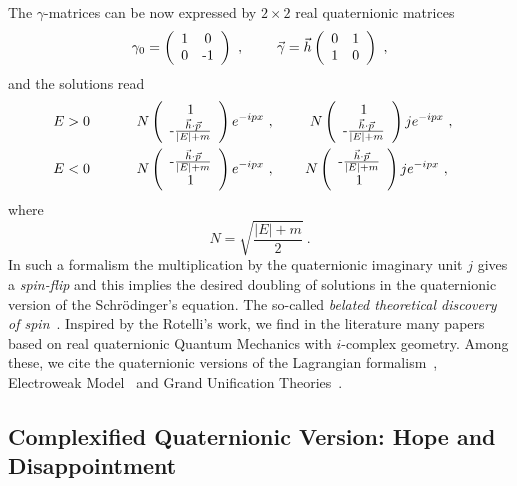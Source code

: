 The $\gamma$-matrices can be now expressed by $2\times 2$ real quaternionic 
matrices
\[ 
\gamma_0 = 
           \left( \begin{array}{cc} 1 & 0\\ 0 & $-$1 \end{array} 
           \right)~,~~~~~~~
\vec{\gamma} = \vec{h}  
           \left( \begin{array}{cc} 0 & 1\\ 1 & 0 \end{array} \right)~,
\]
and the solutions read
\begin{eqnarray*}
E>0~~~~~~~~~~ & N \left( \begin{array}{c} 1 \\ 
                 $-$ \frac{\vec{h} \cdot \vec{p}}{|E|+m} \end{array}
           \right) e^{-ipx}~,~~~~ 
            & N \left( \begin{array}{c} 1 \\ 
                 $-$ \frac{\vec{h} \cdot \vec{p}}{|E|+m} \end{array}
           \right) j e^{-ipx}~,~~~\\
E<0~~~~~~~~~~ & N \left( \begin{array}{c} 
                 $-$ \frac{\vec{h} \cdot \vec{p}}{|E|+m} \\ 1  \end{array}
           \right) e^{-ipx}~,~~~~
            & N \left( \begin{array}{c}
                 $-$ \frac{\vec{h} \cdot \vec{p}}{|E|+m} \\ 1 \end{array}
           \right) j e^{-ipx}~,~~~~
\end{eqnarray*}
where 
\[ N = \sqrt{\frac{|E|+m}{2}}~. \]
In such a formalism the multiplication by the quaternionic imaginary unit $j$
gives a {\em spin-flip} and this implies the desired doubling of solutions in
the quaternionic version of the Schr\"odinger's equation. The so-called
{\em belated theoretical discovery of spin}~\cite{PRD}. Inspired by the 
Rotelli's work, we find in the literature many papers based on real 
quaternionic Quantum Mechanics with $i$-complex geometry. Among these, we cite
the quaternionic versions of the Lagrangian formalism~\cite{LF}, Electroweak 
Model~\cite{EM} and Grand Unification Theories~\cite{GUT}.


\subsection{Complexified Quaternionic Version: Hope and Disappointment}
\label{s32}

